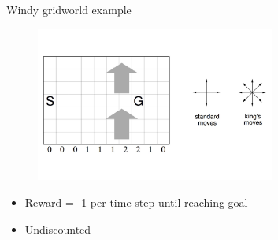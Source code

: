 \bgroup
\begin{frame}{Windy gridworld example}
\begin{figure}
\centering
\includegraphics[width=0.7\textwidth]{img/windy_gridworld.pdf}
\end{figure}
\begin{itemize}
\item Reward = -1 per time step until reaching goal
\item Undiscounted
\end{itemize}
\end{frame}
\egroup